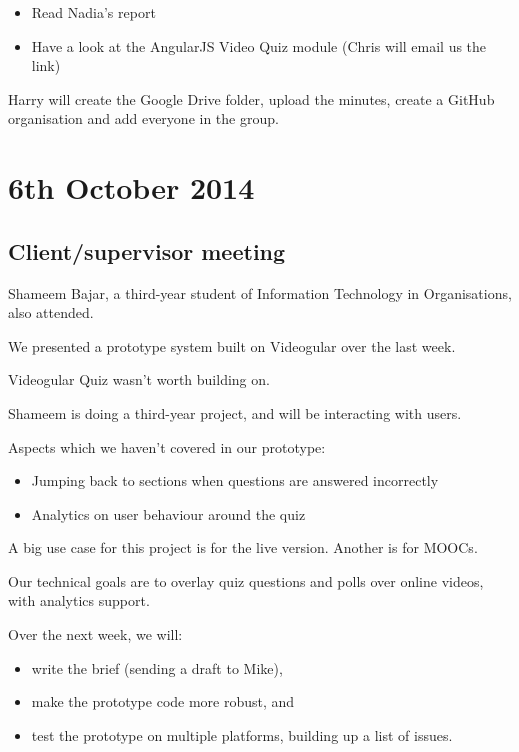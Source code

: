 \begin{itemize}
\itemsep1pt\parskip0pt
\item
  Read Nadia's report
\item
  Have a look at the AngularJS Video Quiz module (Chris will email us the link)
\end{itemize}

Harry will create the Google Drive folder, upload the minutes, create a
GitHub organisation and add everyone in the group.

\section{6th October 2014}\label{Minutes:2014-10-06}

\subsection{Client/supervisor meeting}

Shameem Bajar, a third-year student of Information Technology in
Organisations, also attended.

We presented a prototype system built on \gls{Videogular} over the last week.

Videogular Quiz wasn't worth building on.

Shameem is doing a third-year project, and will be interacting with
users.

Aspects which we haven't covered in our prototype:

\begin{itemize}
\itemsep1pt\parskip0pt
\item
  Jumping back to sections when questions are answered incorrectly
\item
  Analytics on user behaviour around the quiz
\end{itemize}

A big use case for this project is for the live version. Another is for
\glspl{MOOC}.

Our technical goals are to overlay quiz questions and polls over online
videos, with analytics support.

Over the next week, we will:

\begin{itemize}
\itemsep1pt\parskip0pt
\item
  write the brief (sending a draft to Mike),
\item
  make the prototype code more robust, and
\item
  test the prototype on multiple platforms, building up a list of
  issues.
\end{itemize}

